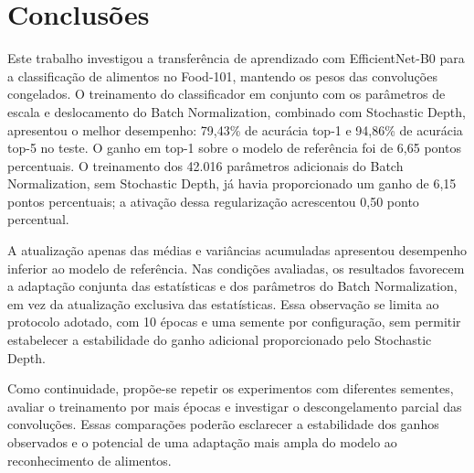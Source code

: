 \section{Conclusões}
\label{sec:conclusoes}

Este trabalho investigou a transferência de aprendizado com EfficientNet-B0
para a classificação de alimentos no Food-101, mantendo os pesos das
convoluções congelados. O treinamento do
classificador em conjunto com os parâmetros de escala e deslocamento do
Batch Normalization, combinado com Stochastic Depth, apresentou o melhor
desempenho: 79,43\% de acurácia top-1 e 94,86\% de acurácia top-5 no
teste. O ganho em top-1 sobre o modelo de referência foi de 6,65 pontos
percentuais. O treinamento dos 42.016 parâmetros adicionais do Batch
Normalization, sem Stochastic Depth, já havia proporcionado um ganho de
6,15 pontos percentuais; a ativação dessa regularização acrescentou
0,50 ponto percentual.

A atualização apenas das médias e variâncias acumuladas apresentou
desempenho inferior ao modelo de referência. Nas condições avaliadas, os
resultados favorecem a adaptação conjunta das estatísticas e dos parâmetros
do Batch Normalization, em vez da atualização exclusiva das estatísticas.
Essa observação se limita ao protocolo adotado, com 10 épocas e uma
semente por configuração, sem permitir estabelecer a estabilidade do ganho
adicional proporcionado pelo Stochastic Depth.

Como continuidade, propõe-se repetir os experimentos com diferentes
sementes, avaliar o treinamento por mais épocas e investigar o
descongelamento parcial das convoluções. Essas comparações poderão
esclarecer a estabilidade dos ganhos observados e o potencial de uma
adaptação mais ampla do modelo ao reconhecimento de alimentos.
